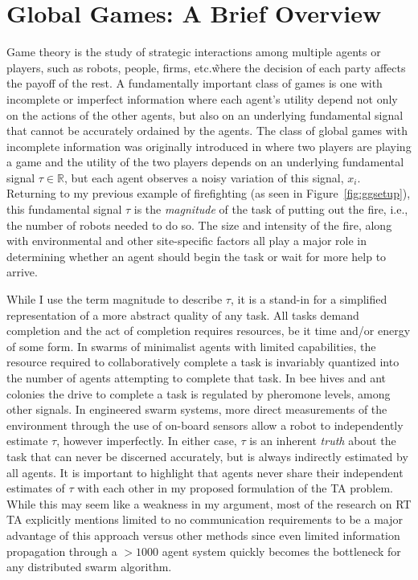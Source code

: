 \documentclass[defaultstyle,12pt]{proposal}
\begin{document}
\section{Global Games: A Brief Overview}\label{sec:ggoverview}
Game theory is the study of strategic interactions among multiple agents or players, such as robots, people, firms, etc.\~where the decision of each party affects the payoff of the rest. A fundamentally important class of games is one with incomplete or imperfect information where each agent's utility depend not only on the actions of the other agents, but also on an underlying fundamental signal that cannot be accurately ordained by the agents. The class of global games with incomplete information was originally introduced in \cite{Carlsson1993} where two players are playing a game and the utility of the two players depends on an underlying fundamental signal $\tau \in \mathbb{R}$, but each agent observes a noisy variation of this signal, $x_i$. Returning to my previous example of firefighting (as seen in Figure~\ref{fig:ggsetup}), this fundamental signal $\tau$ is the \emph{magnitude} of the task of putting out the fire, i.e., the number of robots needed to do so. The size and intensity of the fire, along with environmental and other site-specific factors all play a major role in determining whether an agent should begin the task or wait for more help to arrive.

While I use the term magnitude to describe $\tau$, it is a stand-in for a simplified representation of a more abstract quality of any task. All tasks demand completion and the act of completion requires resources, be it time and/or energy of some form. In swarms of minimalist agents with limited capabilities, the resource required to collaboratively complete a task is invariably quantized into the number of agents attempting to complete that task. In bee hives and ant colonies the drive to complete a task is regulated by pheromone levels, among other signals.  In engineered swarm systems, more direct measurements of the environment through the use of on-board sensors allow a robot to independently estimate $\tau$, however imperfectly. In either case, $\tau$ is an inherent \emph{truth} about the task that can never be discerned accurately, but is always indirectly estimated by all agents. It is important to highlight that agents never share their independent estimates of $\tau$ with each other in my proposed formulation of the TA problem. While this may seem like a weakness in my argument, most of the research on RT TA explicitly mentions limited to no communication requirements to be a major advantage of this approach versus other methods since even limited information propagation through a $>1000$ agent system quickly becomes the bottleneck for any distributed swarm algorithm.
\end{document}

